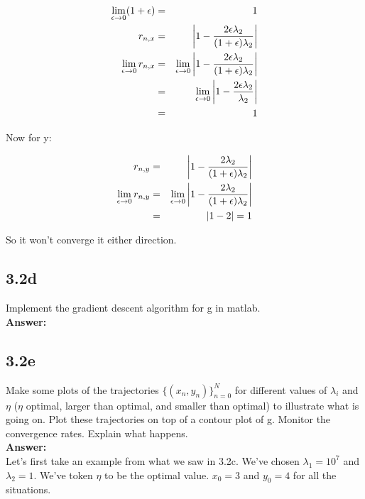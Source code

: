 \documentclass[a4paper]{article}
\begin{document}
\begin{eqnarray}
\lim_{\epsilon \rightarrow 0} (1+\epsilon) &=& 1\\
r_{n,x} &=& \abs{1 - \frac{2\epsilon \lambda_2}{(1 + \epsilon) \lambda_2}}\\
\lim_{ \epsilon\rightarrow 0} r_{n,x} &=& \lim_{ \epsilon\rightarrow 0} \abs{1 - \frac{2\epsilon \lambda_2}{(1 + \epsilon) \lambda_2}}\\
&=& \lim_{ \epsilon\rightarrow 0} \abs{1 - \frac{2 \epsilon\lambda_2}{\lambda_2}}\\
&=& 1
\end{eqnarray}

Now for y:

\begin{eqnarray}
r_{n,y} &=& \abs{ 1- \frac{2\lambda_2}{(1+\epsilon) \lambda_2}}\\
\lim_{ \epsilon\rightarrow 0} r_{n,y} &=& \lim_{ \epsilon\rightarrow 0} \abs{ 1- \frac{2\lambda_2}{(1+\epsilon) \lambda_2}}\\
&=& \abs{1 - 2} = 1
\end{eqnarray}

So it won't converge it either direction. 

\subsection*{3.2d}

Implement the gradient descent algorithm for g in matlab.\\

\textbf{Answer:}\\


\subsection*{3.2e}

Make some plots of the trajectories $\{(x_n,y_n)\}^N_{n=0}$ for different values of $\lambda_i$ and $\eta$ ($\eta$ optimal, larger than optimal, and smaller than optimal) to illustrate what is going on. Plot these trajectories on top of a contour plot of g. Monitor the convergence rates. Explain what happens.\\

\textbf{Answer:}\\

Let's first take an example from what we saw in 3.2c. We've chosen $\lambda_1 = 10^7$ and $\lambda_2 = 1$. We've token $\eta$ to be the optimal value. $x_0 = 3$ and $y_0 = 4$ for all the situations.
\end{document}
